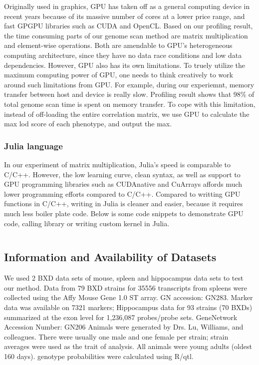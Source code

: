 \documentclass[9pt,twocolumn,twoside,lineno]{gsag3jnl}
\begin{document}
Originally used in graphics, GPU has taken off as a general computing device in recent years because of its massive number of cores at a lower price range, and fast GPGPU libraries such as CUDA and OpenCL.
Based on our profiling result, the time consuming parts of our genome scan method are matrix multiplication and element-wise operations. 
Both are amendable to GPU's heterogeneous computing architecture, since they have no data race conditions and low data dependencies. 
However, GPU also has its own limitations. 
To truely utilize the maximum computing power of GPU, one needs to think creatively to work around such limitations from GPU. 
For example, during our experiemnt, memory transfer between host and device is really slow. 
Profiling result shows that 98\% of total genome scan time is spent on memory transfer. 
To cope with this limitation, instead of off-loading the entire correlation matrix, we use GPU to calculate the max lod score of each phenotype, and output the max. 

\subsubsection{Julia language}
In our experiment of matrix multiplication, Julia's speed is comparable to C/C++. 
However, the low learning curve, clean syntax, as well as support to GPU programming libraries such as CUDAnative and CuArrays affords much lower programming efforts compared to C/C++.
Compared to writting GPU functions in C/C++, writing in Julia is cleaner and easier, because it requires much less boiler plate code.
Below is some code snippets to demonstrate GPU code, calling library or writing custom kernel in Julia. 

\inputminted{julia}{code/gpu.jl}

\subsection{Information and Availability of Datasets}

We used 2 BXD data sets of mouse, spleen and hippocampus data sets to test our method. 
Data from 79 BXD strains for 35556 transcripts from spleens were collected using the Affy Mouse Gene 1.0 ST array. GN accession: GN283. Marker data was available on 7321 markers;
Hippocampus data for 93 strains (70 BXDs) summarized at the exon level for 1,236,087 probes/probe sets.
GeneNetwork Accession Number: GN206
Animals were generated by Drs. Lu, Williams, and colleagues. There were usually one male and one female per strain; strain averages were used as the trait of analysis. All animals were young adults (oldest 160 days).  genotype probabilities were calculated using R/qtl.
\end{document}
